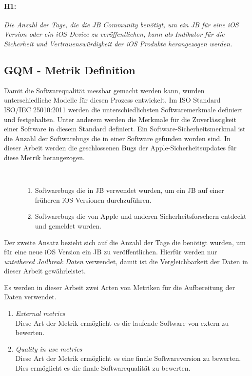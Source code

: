 \paragraph{H1:} \textit{\glqq Die Anzahl der Tage, die die JB Community benötigt, um ein JB für eine iOS Version oder ein iOS Device zu veröffentlichen, kann als Indikator für die Sicherheit und Vertrauenswürdigkeit der iOS Produkte herangezogen werden.\grqq{}}

\subsection{GQM - Metrik Definition}
\label{sec:GQMMetrik}

Damit die Softwarequalität messbar gemacht werden kann, wurden unterschiedliche Modelle für diesen Prozess entwickelt. Im ISO Standard ISO/IEC 25010:2011 werden die unterschiedlichsten Softwaremerkmale definiert und festgehalten. \cite{IOS25010} Unter anderem werden die Merkmale für die Zuverlässigkeit einer Software in diesem Standard definiert. Ein Software-Sicherheitsmerkmal ist die Anzahl der Softwarebugs die in einer Software gefunden worden sind. In dieser Arbeit werden die geschlossenen Bugs der Apple-Sicherheitsupdates für diese Metrik herangezogen.
\begin{description}
    \item[\parbox{\textwidth} {In dieser Arbeit werden zwei Arten von Bugs unterschieden, die in den iOS Sicherheitsupdates geschlossen werden}]~\par
    \begin{enumerate}
        \item Softwarebugs die in JB verwendet wurden, um ein JB auf einer früheren iOS Versionen durchzuführen. 
        \item Softwarebugs die von Apple und anderen Sicherheitsforschern entdeckt und gemeldet wurden.
    \end{enumerate}
\end{description} 
 \par
Der zweite Ansatz bezieht sich auf die Anzahl der Tage die benötigt wurden, um für eine neue iOS Version ein JB zu veröffentlichen. Hierfür werden nur \textit{\glqq untethered Jailbreak Daten\grqq{}} verwendet, damit ist die Vergleichbarkeit der Daten in dieser Arbeit gewährleistet. \par 
Es werden in dieser Arbeit zwei Arten von Metriken für die Aufbereitung der Daten verwendet.
\begin{enumerate}
    \item \textit{\glqq External metrics\grqq{}}\\
    Diese Art der Metrik ermöglicht es die laufende Software von extern zu bewerten.
    \item \textit{\glqq Quality in use metrics\grqq{}} \\
    Diese Art der Metrik ermöglicht es eine finale Softwareversion zu bewerten. Dies ermöglicht es die finale Softwarequalität zu bewerten.
\end{enumerate}


